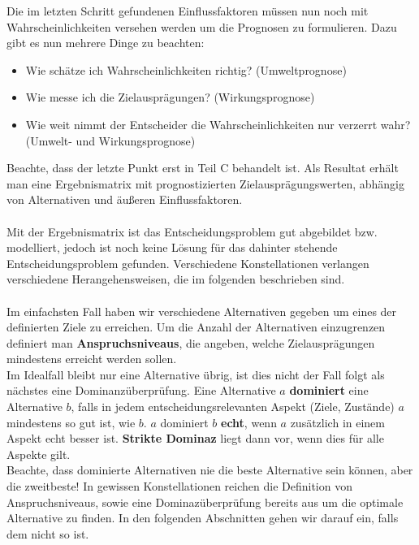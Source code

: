 Die im letzten Schritt gefundenen Einflussfaktoren müssen nun noch mit Wahrscheinlichkeiten versehen werden um die Prognosen zu formulieren. Dazu gibt es nun mehrere Dinge zu beachten:
\begin{itemize}
	\item Wie schätze ich Wahrscheinlichkeiten richtig? (Umweltprognose)
	\item Wie messe ich die Zielausprägungen? (Wirkungsprognose)
	\item Wie weit nimmt der Entscheider die Wahrscheinlichkeiten nur verzerrt wahr? (Umwelt- und Wirkungsprognose)
\end{itemize}
Beachte, dass der letzte Punkt erst in Teil C behandelt ist. Als Resultat erhält man eine Ergebnismatrix mit prognostizierten Zielausprägungswerten, abhängig von Alternativen und äußeren Einflussfaktoren.\\
\ \\
Mit der Ergebnismatrix ist das Entscheidungsproblem gut abgebildet bzw. modelliert, jedoch ist noch keine Lösung für das dahinter stehende Entscheidungsproblem gefunden. Verschiedene Konstellationen verlangen verschiedene Herangehensweisen, die im folgenden beschrieben sind.\\
\ \\
Im einfachsten Fall haben wir verschiedene Alternativen gegeben um eines der definierten Ziele zu erreichen. Um die Anzahl der Alternativen einzugrenzen definiert man \textbf{Anspruchsniveaus}, die angeben, welche Zielausprägungen mindestens erreicht werden sollen.\\
Im Idealfall bleibt nur eine Alternative übrig, ist dies nicht der Fall folgt als nächstes eine Dominanzüberprüfung.
Eine Alternative \(a\) \textbf{dominiert} eine Alternative \(b\), falls in jedem entscheidungsrelevanten Aspekt (Ziele, Zustände) \(a\) mindestens so gut ist, wie \(b\). \(a\) dominiert \(b\) \textbf{echt}, wenn \(a\) zusätzlich in einem Aspekt echt besser ist. \textbf{Strikte Dominaz} liegt dann vor, wenn dies für alle Aspekte gilt.\\
Beachte, dass dominierte Alternativen nie die beste Alternative sein können, aber die zweitbeste! In gewissen Konstellationen reichen die Definition von Anspruchsniveaus, sowie eine Dominazüberprüfung bereits aus um die optimale Alternative zu finden. In den folgenden Abschnitten gehen wir darauf ein, falls dem nicht so ist.

